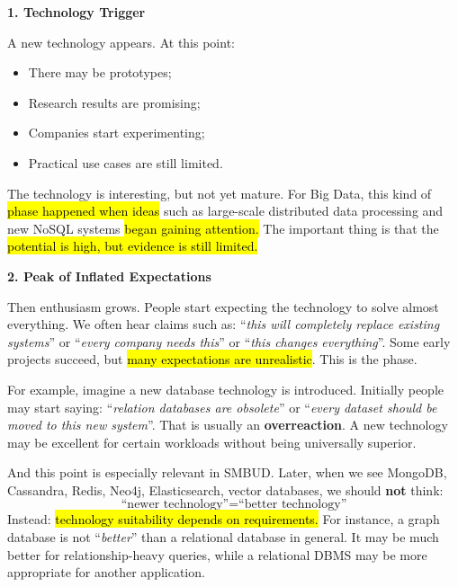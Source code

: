 \highspace
\begin{flushleft}
    \textcolor{Green3}{ \textbf{1. Technology Trigger}}
\end{flushleft}
A new technology appears. At this point:
\begin{itemize}
    \item There may be prototypes;
    \item Research results are promising;
    \item Companies start experimenting;
    \item Practical use cases are still limited.
\end{itemize}
The technology is interesting, but not yet mature. For Big Data, this kind of \hl{phase happened when ideas} such as large-scale distributed data processing and new NoSQL systems \hl{began gaining attention.} The important thing is that the \hl{potential is high, but evidence is still limited.}

\highspace
\begin{flushleft}
    \textcolor{Green3}{ \textbf{2. Peak of Inflated Expectations}}
\end{flushleft}
Then enthusiasm grows. People start expecting the technology to solve almost everything. We often hear claims such as: ``\emph{this will completely replace existing systems}'' or ``\emph{every company needs this}'' or ``\emph{this changes everything}''. Some early projects succeed, but \hl{many expectations are unrealistic}. This is the  phase.

\highspace
For example, imagine a new database technology is introduced. Initially people may start saying: ``\emph{relation databases are obsolete}'' or ``\emph{every dataset should be moved to this new system}''. That is usually an \textbf{overreaction}. A new technology may be excellent for certain workloads without being universally superior.

\highspace
And this point is especially relevant in SMBUD. Later, when we see MongoDB, Cassandra, Redis, Neo4j, Elasticsearch, vector databases, we should \textbf{not} think:
\begin{equation*}
    \text{``newer technology''} = \text{``better technology''}
\end{equation*}
Instead: \hl{technology suitability depends on requirements.} For instance, a graph database is not ``\emph{better}'' than a relational database in general. It may be much better for relationship-heavy queries, while a relational DBMS may be more appropriate for another application.

